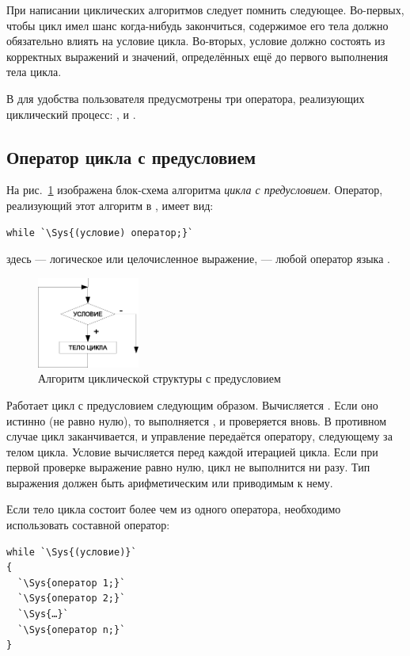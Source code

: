 При написании циклических алгоритмов следует помнить следующее. Во-первых, чтобы цикл имел шанс когда-нибудь
закончиться, содержимое его тела должно обязательно влиять на условие цикла. Во-вторых, условие должно состоять из
корректных выражений и значений, определённых ещё до первого выполнения тела цикла. 

В  для удобства пользователя предусмотрены три оператора, реализующих циклический процесс: ,
 и .

\subsection[Оператор цикла с предусловием]{Оператор цикла с предусловием}
На рис.~\ref{ch03:refDrawing21} изображена блок-схема алгоритма \emph{цикла с предусловием}. Оператор, реализующий этот алгоритм в , имеет вид:
\begin{lstlisting}
while `\Sys{(условие) оператор;}`
\end{lstlisting}
здесь  --- логическое или целочисленное выражение,  --- любой оператор языка .

\begin{figure}[htb]
\begin{center}
\includegraphics[width=0.3\textwidth]{img/ris_3_22}
\caption{Алгоритм циклической структуры с предусловием}
\label{ch03:refDrawing21}
\end{center}
\end{figure}

Работает цикл с предусловием следующим образом. Вычисляется . Если оно истинно (не равно
нулю), то выполняется , и  проверяется вновь. В противном случае цикл заканчивается, и управление передаётся
оператору, следующему за телом цикла. Условие вычисляется перед каждой итерацией цикла. Если при первой проверке
выражение равно нулю, цикл не выполнится ни разу. Тип выражения должен быть арифметическим или приводимым к нему. 

Если тело цикла состоит более чем из одного оператора, необходимо использовать составной оператор:
\begin{lstlisting}
while `\Sys{(условие)}`
{
  `\Sys{оператор 1;}`
  `\Sys{оператор 2;}`
  `\Sys{…}`
  `\Sys{оператор n;}`
}
\end{lstlisting}

